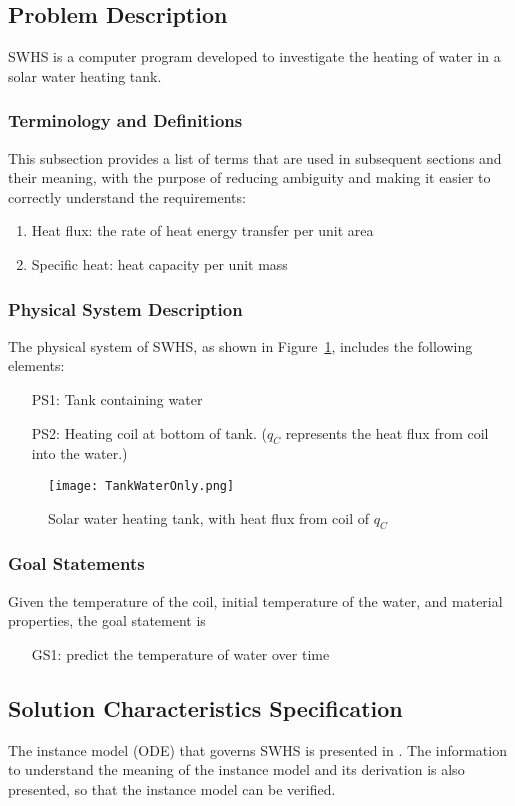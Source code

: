 \documentclass[12pt]{article}
\begin{document}
\subsection{Problem Description}
\label{Sec:PD}
SWHS is a computer program developed to investigate the heating of water in a solar water heating tank.
\subsubsection{Terminology and Definitions}
\label{Sec:TaD}
This subsection provides a list of terms that are used in subsequent sections and their meaning, with the purpose of reducing ambiguity and making it easier to correctly understand the requirements:
\begin{enumerate}
\item{Heat flux: the rate of heat energy transfer per unit area}
\item{Specific heat: heat capacity per unit mass}
\end{enumerate}
\subsubsection{Physical System Description}
\label{Sec:PSD}
The physical system of SWHS, as shown in Figure~\ref{Figure:Swhtwhffco}, includes the following elements:
\begin{itemize}
\item[PS1:]Tank containing water
\item[PS2:]Heating coil at bottom of tank. ($q_{C}$ represents the heat flux from coil into the water.)
\end{itemize}
\begin{figure}
\begin{center}
\texttt{[image: TankWaterOnly.png]}
\caption{Solar water heating tank, with heat flux from coil of $q_{C}$}
\label{Figure:Swhtwhffco}
\end{center}
\end{figure}
\subsubsection{Goal Statements}
\label{Sec:GSs}
Given the temperature of the coil, initial temperature of the water, and material properties, the goal statement is
\begin{itemize}
\item[GS1:]predict the temperature of water over time
\end{itemize}
\subsection{Solution Characteristics Specification}
\label{Sec:SCS}
The instance model (ODE) that governs SWHS is presented in . The information to understand the meaning of the instance model and its derivation is also presented, so that the instance model can be verified.
\end{document}
